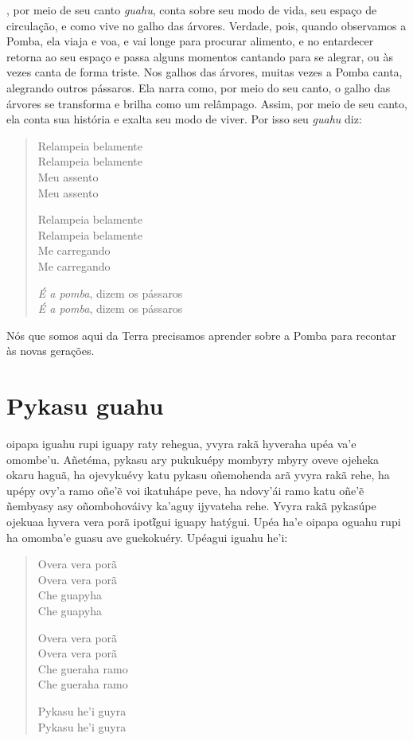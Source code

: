 , por meio de seu canto \textit{guahu}, conta sobre seu modo de vida,
seu espaço de circulação, e como vive no galho das árvores. Verdade,
pois, quando observamos a Pomba, ela viaja e voa, e vai longe para
procurar alimento, e no entardecer retorna ao seu espaço e passa alguns
momentos cantando para se alegrar, ou às vezes canta de forma triste.
Nos galhos das árvores, muitas vezes a Pomba canta, alegrando outros
pássaros. Ela narra como, por meio do seu canto, o galho das árvores se
transforma e brilha como um relâmpago. Assim, por meio de seu canto, ela
conta sua história e exalta seu modo de viver. Por isso seu \textit{guahu}
diz:

\begin{verse}
Relampeia belamente\\
Relampeia belamente\\
Meu assento\\
Meu assento

Relampeia belamente\\
Relampeia belamente\\
Me carregando\\
Me carregando

\textit{É a pomba}, dizem os pássaros\\
\textit{É a pomba}, dizem os pássaros
\end{verse}

Nós que somos aqui da Terra precisamos aprender sobre a Pomba para
recontar às novas gerações.

\chapter{Pykasu guahu}

 oipapa iguahu rupi iguapy raty rehegua, yvyra rakã hyveraha upéa
va'e omombe'u. Añetéma, pykasu ary pukukuépy mombyry mbyry oveve ojeheka
okaru haguã, ha ojevykuévy katu pykasu oñemohenda arã yvyra rakã rehe,
ha upépy ovy'a ramo oñe'ẽ voi ikatuhápe peve, ha ndovy'ái ramo katu
oñe'ẽ ñembyasy asy oñombohováivy ka'aguy ijyvateha rehe. Yvyra rakã
pykasúpe ojekuaa hyvera vera porã ipotῖgui iguapy hatýgui. Upéa ha'e
oipapa oguahu rupi ha omomba'e guasu ave guekokuéry. Upéagui iguahu
he'i:

\begin{verse}
Overa vera porã\\
Overa vera porã\\
Che guapyha\\
Che guapyha

Overa vera porã\\
Overa vera porã\\
Che gueraha ramo\\
Che gueraha ramo

Pykasu he'i guyra\\
Pykasu he'i guyra
\end{verse}

